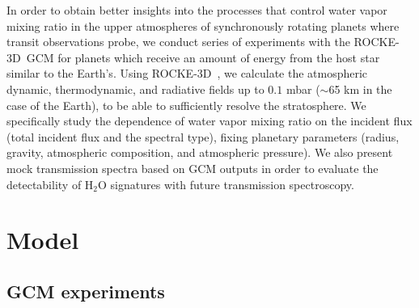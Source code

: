 \documentclass[11pt,numberedappendix,twocolappendix,]{emulateapj}
\def\water{H$_2$O }
\def\modelE{ROCKE-3D}
\def\memo#1{\color{red}$[${\bf #1}$]$ \color{black}}
\begin{document}

In order to obtain better insights into the processes that control water vapor mixing ratio in the upper atmospheres of synchronously rotating planets where transit observations probe, we conduct series of experiments with the \modelE \ GCM for planets which receive an amount of energy from the host star similar to the Earth's. 
Using \modelE \ , we calculate the atmospheric dynamic, thermodynamic, and radiative fields up to $0.1$ mbar ($\sim $65 km in the case of the Earth), to be able to sufficiently resolve the stratosphere. 
We specifically study the dependence of water vapor mixing ratio on the incident flux (total incident flux and the spectral type), fixing planetary parameters (radius, gravity, atmospheric composition, and atmospheric pressure). 
We also present mock transmission spectra based on GCM outputs in order to evaluate the detectability of \water signatures with future transmission spectroscopy. 




\section{Model}
\label{s:model}

\subsection{GCM experiments}
\end{document}
